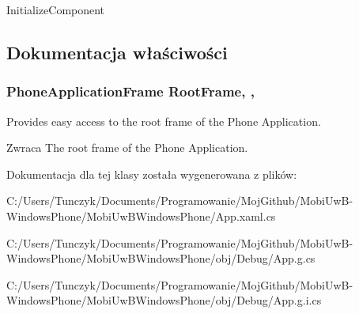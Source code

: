 Initialize\+Component 



\subsection{Dokumentacja właściwości}
\hypertarget{a00005_abd1ba24576ffbc3d4bfd0c0269a14b4c}{}
\subsubsection[{Root\+Frame}]{\setlength{\rightskip}{0pt plus 5cm}Phone\+Application\+Frame Root\+Frame\hspace{0.3cm}{\ttfamily [static]}, {\ttfamily [get]}, {}}\label{a00005_abd1ba24576ffbc3d4bfd0c0269a14b4c}


Provides easy access to the root frame of the Phone Application. 

\begin{DoxyReturn}{Zwraca}
The root frame of the Phone Application.
\end{DoxyReturn}


Dokumentacja dla tej klasy została wygenerowana z plików\+:\begin{DoxyCompactItemize}
\item 
C\+:/\+Users/\+Tunczyk/\+Documents/\+Programowanie/\+Moj\+Github/\+Mobi\+Uw\+B-\/\+Windows\+Phone/\+Mobi\+Uw\+B\+Windows\+Phone/App.\+xaml.\+cs\item 
C\+:/\+Users/\+Tunczyk/\+Documents/\+Programowanie/\+Moj\+Github/\+Mobi\+Uw\+B-\/\+Windows\+Phone/\+Mobi\+Uw\+B\+Windows\+Phone/obj/\+Debug/App.\+g.\+cs\item 
C\+:/\+Users/\+Tunczyk/\+Documents/\+Programowanie/\+Moj\+Github/\+Mobi\+Uw\+B-\/\+Windows\+Phone/\+Mobi\+Uw\+B\+Windows\+Phone/obj/\+Debug/App.\+g.\+i.\+cs\end{DoxyCompactItemize}
